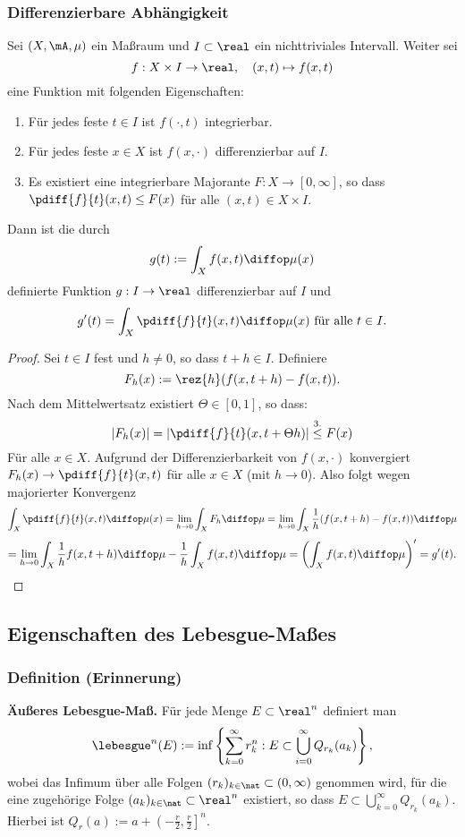 \subsubsection{Differenzierbare Abhängigkeit}
\begin{thm}
 Sei $(X, \mA, \mu)$ ein Maßraum und $I \subset \real$ ein nichttriviales Intervall. Weiter sei 
 \[ f: X \times I \to \real, \quad (x,t) \mapsto f(x,t) \]
 eine Funktion mit folgenden Eigenschaften:
 \begin{enumerate}
  \item Für jedes feste $t \in I$ ist $f( \cdot, t )$ integrierbar.
  \item Für jedes feste $x \in X$ ist $f( x, \cdot )$ differenzierbar auf $I$.
  \item Es existiert eine integrierbare Majorante $F: X \to [0,\infty]$, so dass $\pdiff{f}{t}(x,t) \le F(x)$ für alle $(x,t) \in X \times I$.
 \end{enumerate}
 Dann ist die durch
 \[ g(t) := \int_X f(x,t) \diffop \mu(x)  \]
 definierte Funktion $g: I \to \real$ differenzierbar auf $I$ und
 \[ g'(t) = \int_X \pdiff{f}{t}(x,t) \diffop \mu(x) \text{ für alle } t \in I. \]
\end{thm}

\begin{proof}
 Sei $t \in I$ fest und $h \ne 0$, so dass $t+h \in I$. Definiere
 \[ F_h(x) := \rez{h}( f(x, t+h) - f(x,t) ). \]
 Nach dem Mittelwertsatz existiert $\Theta \in [0,1]$, so dass:
 \[ |F_h(x)| = \left| \pdiff{f}{t} (x, t + \Theta h) \right| \stackrel{\mathrm{3.}}\le F(x) \]
 Für alle $x \in X$. Aufgrund der Differenzierbarkeit von $f(x, \cdot)$ konvergiert $F_h(x) \to \pdiff{f}{t}(x,t)$ für alle $x \in X$ (mit $h \to 0$). Also folgt wegen majorierter Konvergenz
 \[ \int_X \pdiff{f}{t}(x,t) \diffop \mu(x) = \lim_{h \to 0} \int_X F_h \diffop \mu =
 \lim_{h\to0} \int_X \frac{1}{h}(f(x,t+h)-f(x,t))\diffop\mu \]\[=
 \lim_{h\to0} \int_X \frac{1}{h}f(x,t+h)\diffop\mu -\frac{1}{h}\int_Xf(x,t)\diffop\mu=
 \left( \int_X f(x,t)\diffop\mu \right)'
 = g'(t). \qedhere \]
\end{proof}

\clearpage

\subsection{Eigenschaften des Lebesgue-Maßes}
\subsubsection{Definition (Erinnerung)}
 \textbf{Äußeres Lebesgue-Maß.} Für jede Menge $E \subset \real^n$ definiert man
 \[ \lebesgue^n( E ) := \inf \left\{ \sum_{k=0}^\infty r_k^n : E \subset \bigcup_{i=0}^\infty Q_{r_k}(a_k) \right\}, \]
 wobei das Infimum über alle Folgen $(r_k)_{k \in \nat} \subset (0, \infty)$ genommen wird, für die eine zugehörige Folge $(a_k)_{k \in \nat} \subset \real^n$ existiert, so dass $E \subset \bigcup_{k=0}^\infty Q_{r_k}(a_k)$. Hierbei ist $Q_{r}(a) := a + \left(-\frac{r}{2}, \frac{r}{2} \right]^n$.

